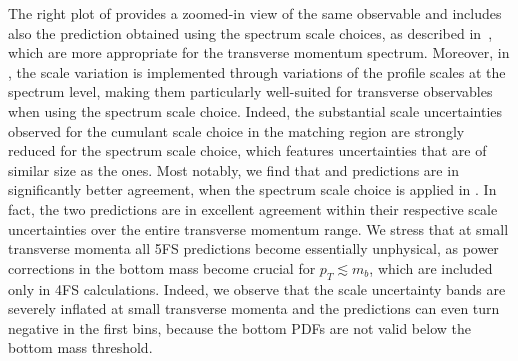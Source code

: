 \documentclass[11pt,a4paper]{article}
\begin{document}
The right plot of  provides a zoomed-in view of the same observable and includes also the \GENEVA{} prediction obtained using the spectrum scale choices, as described in~, which are more appropriate for the transverse momentum spectrum. 
Moreover, in \GENEVA{}, the scale variation is implemented through variations of the profile scales at the spectrum level, making them particularly well-suited for transverse observables when using the spectrum scale choice. Indeed, the substantial 
scale uncertainties observed for the cumulant scale choice
in the matching region are strongly reduced for the spectrum scale choice, which 
features uncertainties that are of similar size as the \minnlo{} ones.
Most notably, we find that \minnlo{} and \GENEVA{} predictions are in significantly 
better agreement, when the spectrum scale choice is applied in \GENEVA{}.
In fact, the two predictions are in excellent agreement within their respective scale
uncertainties over the entire transverse momentum range.
We stress that at small transverse momenta all 5FS predictions
become essentially unphysical, as power corrections in the 
bottom mass become crucial for $p_T\lesssim m_b$, which are included only 
in 4FS calculations. Indeed, we observe that the scale uncertainty bands are
severely inflated at small transverse momenta and the predictions can
even turn negative in the first bins, because the bottom PDFs are not valid below
the bottom mass threshold.
\end{document}
